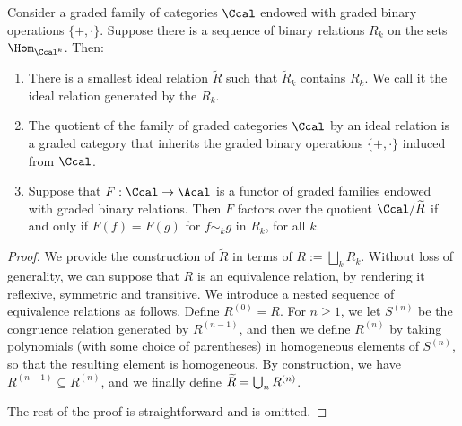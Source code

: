 \begin{lemma}\label{lemma:ideal-relation}
Consider a graded family of categories $\Ccal$ endowed with graded binary operations $\{+, \cdot \}$. Suppose there is a sequence of binary relations $R_{k}$ on the sets $\Hom_{\Ccal^k}$. Then:
\begin{enumerate}
\item\label{lemma:ideal-relation-1} There is a smallest ideal relation $\widetilde{R}$ such that $\widetilde{R}_{k}$ contains $R_{k}$. We call it the ideal relation generated by the $R_k$.
\item\label{lemma:ideal-relation-2} The quotient of the family of graded categories $\Ccal$ by an ideal relation is a graded category that inherits the graded binary operations $\{+,\cdot \}$ induced from $\Ccal$.
\item\label{lemma:ideal-relation-3} Suppose that $F: \Ccal \to \Acal$ is a functor of graded families endowed with graded binary relations. Then $F$ factors over the quotient $\Ccal/\widetilde{R}$ if and only if $F(f)=F(g)$ for $f \sim_k g$ in $R_{k}$, for all $k$.
\end{enumerate}
\end{lemma}
\begin{proof}
We provide the construction of $\widetilde{R}$ in terms of $R:=\bigsqcup_{k}R_{k}$. Without loss of generality, we can suppose that $R$ is an equivalence relation, by rendering it reflexive, symmetric and transitive. We introduce a nested sequence of equivalence relations as follows. Define $R^{(0)}=R$. For $n\geq 1$, we let $S^{(n)}$ be the congruence relation generated by $R^{(n-1)}$, and then we define $R^{(n)}$ by taking polynomials (with some choice of parentheses) in homogeneous elements of $S^{(n)}$, so that the resulting element is homogeneous. By construction, we have $R^{(n-1)}\subseteq R^{(n)}$, and we finally define $\widetilde{R}=\nobreak\bigcup_{n}R^{(n)}$.

The rest of the proof is straightforward and is omitted.
\end{proof}

